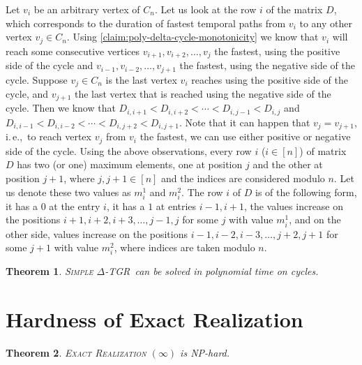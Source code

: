 \documentclass[11pt,a4paper]{article}
\newtheorem{theorem}{Theorem}
\theoremstyle{remark}
\theoremstyle{definition}
\newcommand{\ie}{i.\,e.,\ }
\newcommand{\NP}{\textrm{NP}}
\newcommand{\deltaExact}{\textsc{Simple $\Delta$-TGR}}
\begin{document}
Let $v_i$ be an arbitrary vertex of $C_n$. Let us look at the row $i$ of the matrix $D$, which corresponds to the duration of fastest temporal paths from $v_i$ to any other vertex $v_j \in C_n$.
Using \cref{claim:poly-delta-cycle-monotonicity} we know that $v_i$ will reach some consecutive vertices $v_{i+1}, v_{i+2}, \dots, v_j$ the fastest, using the positive side of the cycle 
and $v_{i-1}, v_{i-2}, \dots, v_{j+1}$ the fastest, using the negative side of the cycle.
Suppose $v_j \in C_n$ is the last vertex $v_i$ reaches using the positive side of the cycle, and $v_{j+1}$ the last vertex that is reached using the negative side of the cycle.
Then we know that $D_{i,i+1} < D_{i,i+2} < \cdots< D_{i,j-1} < D_{i,j}$ and 
$D_{i,i-1} < D_{i,i-2} < \cdots < D_{i,j+2} < D_{i,j+1}$.
Note that it can happen that $v_j = v_{j+1}$, \ie to reach vertex $v_j$ from $v_i$ the fastest, we can use either positive or negative side of the cycle.
Using the above observations, every row $i$ ($i \in [n]$) of matrix $D$ has two (or one) maximum elements, one at position $j$ and the other at position $j+1$, where $j, j+1 \in [n]$ and the indices are considered modulo $n$.
Let us denote these two values as $m_i^1$ and $m_i^2$.
The row $i$ of $D$ is of the following form, it has a $0$ at the entry $i$, it has a $1$ at entries $i-1, i+1$,
the values increase on the positions $i+1, i+2, i+3, \dots, j-1, j$ for some $j$ with value $m_i^1$, 
and on the other side, values increase on the positions $i-1, i-2, i-3, \dots, j+2, j+1$ for some $j+1$ with value $m_i^2$,
where indices are taken modulo $n$.

\begin{theorem}
    \deltaExact\ can be solved in polynomial time on cycles.
\end{theorem}

    
\section{Hardness of Exact Realization}


\begin{theorem}
	\textsc{Exact Realization $(\infty)$} is \NP-hard.
\end{theorem}
\end{document}
